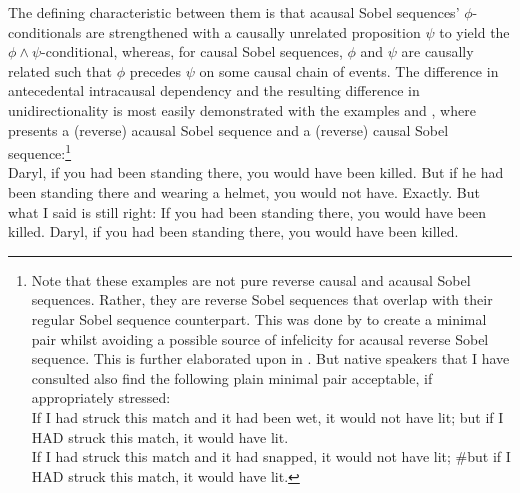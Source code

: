 The defining characteristic between them is that acausal Sobel sequences' $\phi$-conditionals are strengthened with a causally unrelated proposition $\psi$ to yield the $\phi\land\psi$-conditional, whereas, for causal Sobel sequences, $\phi$ and $\psi$ are causally related such that $\phi$ precedes $\psi$ on some causal chain of events. The difference in antecedental intracausal dependency and the resulting difference in unidirectionality is most easily demonstrated with the examples  and , where  presents a (reverse) acausal Sobel sequence and  a (reverse) causal Sobel sequence:\footnote{Note that these examples are not pure reverse causal and acausal Sobel sequences. Rather, they are reverse Sobel sequences that overlap with their regular Sobel sequence counterpart. This was done by \textcite{Klecha2014} to create a minimal pair whilst avoiding a possible source of infelicity for acausal reverse Sobel sequence. This is further elaborated upon in . But native speakers that I have consulted also find the following plain minimal pair acceptable, if appropriately stressed:\vspace{0mm}
\ex[exno=i] \\If I had struck this match and it had been wet, it would not have lit; but if I \MakeUppercase{had} struck this match, it would have lit.
\xe%
\ex[exno=ii] \\If I had struck this match and it had snapped, it would not have lit; \#but if I \MakeUppercase{had} struck this match, it would have lit.
\xe}\\
\pex{}
			\a	{}Daryl, if you had been standing there, you would have been killed.
			\a	{}But if he had been standing there and wearing a helmet, you would not have.
			\a	{}Exactly. But what I said is still right:  If you had been
standing there, you would have been killed.\hfill\parencite[p. 152f]{Klecha2014}
\xe
\pex{}
			\a	{}Daryl, if you had been standing there, you would have been killed.
